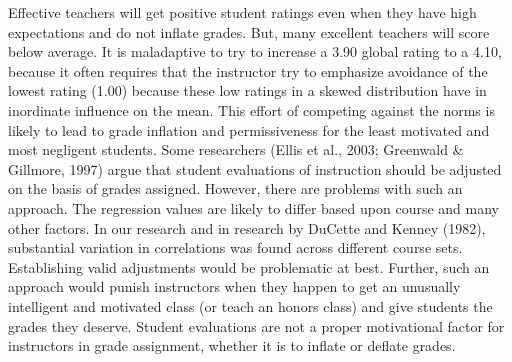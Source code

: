 \documentclass[,man,mask]{apa6}
\begin{document}
Effective teachers will get positive student ratings even when they have high expectations and do not inflate grades. But, many excellent teachers will score below average. It is maladaptive to try to increase a 3.90 global rating to a 4.10, because it often requires that the instructor try to emphasize avoidance of the lowest rating (1.00) because these low ratings in a skewed distribution have in inordinate influence on the mean. This effort of competing against the norms is likely to lead to grade inflation and permissiveness for the least motivated and most negligent students. Some researchers (Ellis et al., 2003; Greenwald \& Gillmore, 1997) argue that student evaluations of instruction should be adjusted on the basis of grades assigned. However, there are problems with such an approach. The regression values are likely to differ based upon course and many other factors. In our research and in research by DuCette and Kenney (1982), substantial variation in correlations was found across different course sets. Establishing valid adjustments would be problematic at best. Further, such an approach would punish instructors when they happen to get an unusually intelligent and motivated class (or teach an honors class) and give students the grades they deserve. Student evaluations are not a proper motivational factor for instructors in grade assignment, whether it is to inflate or deflate grades.
\end{document}
